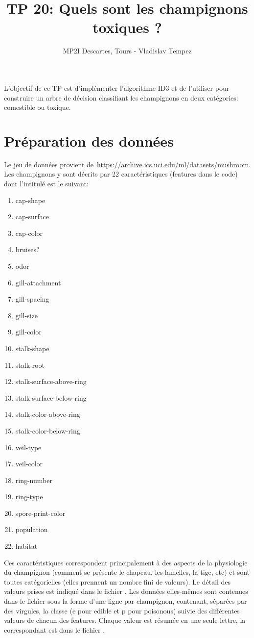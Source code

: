 \documentclass[a4paper, 10pt]{article}
\author{MP2I Descartes, Tours - Vladislav Tempez}
\title{TP 20: Quels sont les champignons toxiques ?}
\begin{document}
\maketitle
L'objectif de ce TP est d'implémenter l'algorithme ID3 et de l'utiliser pour construire un arbre de décision classifiant les champignons en deux catégories: comestible ou toxique.
\section{Préparation des données}
Le jeu de données provient de~\url{https://archive.ics.uci.edu/ml/datasets/mushroom}. Les champignons y sont décrits par 22 caractéristiques (features dans le code) dont l'intitulé est le suivant:
\begin{multicols}{4}
\begin{enumerate}
\item cap-shape
\item cap-surface
\item cap-color
\item bruises?
\item odor
\item gill-attachment
\item gill-spacing
\item gill-size
\item gill-color
\item stalk-shape
\item stalk-root
\item stalk-surface-above-ring
\item stalk-surface-below-ring
\item stalk-color-above-ring
\item stalk-color-below-ring
\item veil-type
\item veil-color
\item ring-number
\item ring-type
\item spore-print-color
\item population
\item habitat
\end{enumerate}
\end{multicols}
Ces caractéristiques correspondent principalement à des aspects de la physiologie du champignon (comment se présente le chapeau, les lamelles, la tige, etc) et sont toutes catégorielles (elles prennent un nombre fini de valeurs). Le détail des valeurs prises est indiqué dans le fichier .
Les données elles-mêmes sont contenues dans le fichier  sous la forme d'une ligne par champignon, contenant, séparées par des virgules, la classe (e pour edible et p pour poisonous) suivie des différentes valeurs de chacun des features. Chaque valeur est résumée en une seule lettre, la correspondant est dans le fichier .
\end{document}
